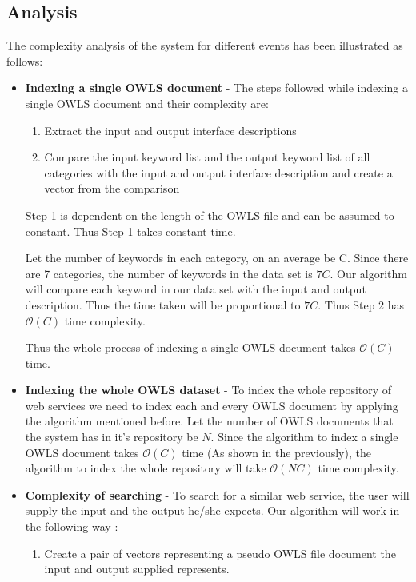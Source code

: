 \documentclass[12pt, oneside]{book}
\begin{document}
\subsection{Analysis}
The complexity analysis of the system for different events has been illustrated as follows:
\begin{itemize}
 \item \textbf{Indexing a single OWLS document} - The steps followed while indexing a single OWLS document and their complexity are:
 \begin{enumerate}
  \item Extract the input and output interface descriptions
  \item Compare the input keyword list and the output keyword list of all categories with the input and output interface description and create a vector from the comparison
 \end{enumerate}
 Step 1 is dependent on the length of the OWLS file and can be assumed to constant. Thus Step 1 takes constant time. \\ \par
 Let the number of keywords in each category, on an average be C. Since there are 7 categories, the number of keywords in the data set is $7C$. Our algorithm will compare each keyword in our data set with the input and output description. Thus the time taken will be proportional to $7C$. Thus Step 2 has $ \mathcal{O}(C)$ time complexity. \\ \par
 Thus the whole process of indexing a single OWLS document takes $\mathcal{O}(C)$ time.
 \item \textbf{Indexing the whole OWLS dataset} - To index the whole repository of web services we need to index each and every OWLS document by applying the algorithm mentioned before. Let the number of OWLS documents that the system has in it's repository be $N$. Since the algorithm to index a single OWLS document takes $\mathcal{O}(C)$ time (As shown in the previously), the algorithm to index the whole repository will take $\mathcal{O}(NC)$ time complexity.
 \item \textbf{Complexity of searching} - To search for a similar web service, the user will supply the input and the output he/she expects. Our algorithm will work in the following way :
 \begin{enumerate}
  \item Create a pair of vectors representing a pseudo OWLS file document the input and output supplied represents.

\end{enumerate}
\end{itemize}
\end{document}
